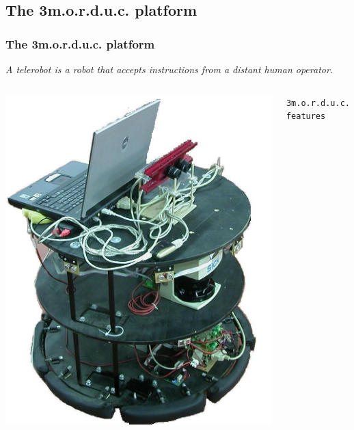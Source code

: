 \subsection{The 3m.o.r.d.u.c. platform}
\frame
{
  \frametitle{The  3m.o.r.d.u.c. platform}
  
  \emph{A \alert{telerobot} is a robot that accepts instructions
    from a distant human operator.}

  \vskip10pt

  \begin{columns}

     {
      
      \includegraphics[width=\textwidth]{img/3morduc.jpg}
    }

     {

      \begin{block} {\alert{\texttt{3m.o.r.d.u.c. features}}}
        
        \pause
        
        \begin{itemize}
          

\end{itemize}
\end{block}}
\end{columns}}
